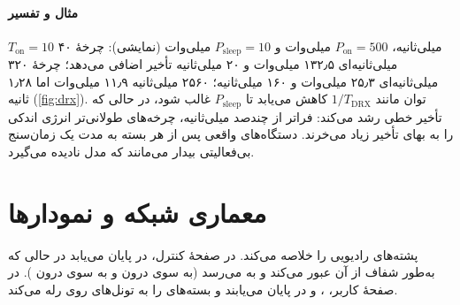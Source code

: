 \documentclass[11pt,a4paper]{article}
\begin{document}
\paragraph{مثال و تفسیر} $T_{\mathrm{on}} = 10$ میلی‌ثانیه، $P_{\mathrm{on}} = 500$ میلی‌وات و
$P_{\mathrm{sleep}} = 10$ میلی‌وات (نمایشی): چرخهٔ ۴۰ میلی‌ثانیه‌ای ۱۳۲٫۵ میلی‌وات و ۲۰ میلی‌ثانیه تأخیر
اضافی می‌دهد؛ چرخهٔ ۳۲۰ میلی‌ثانیه‌ای ۲۵٫۳ میلی‌وات و ۱۶۰ میلی‌ثانیه؛ ۲۵۶۰ میلی‌ثانیه ۱۱٫۹ میلی‌وات اما ۱٫۲۸
ثانیه (\cref{fig:drx}). توان مانند $1/T_{\mathrm{DRX}}$ کاهش می‌یابد تا $P_{\mathrm{sleep}}$ غالب شود، در حالی که
تأخیر خطی رشد می‌کند: فراتر از چندصد میلی‌ثانیه، چرخه‌های طولانی‌تر انرژی اندکی را به بهای تأخیر زیاد
می‌خرند. دستگاه‌های واقعی پس از هر بسته به مدت یک زمان‌سنج بی‌فعالیتی بیدار می‌مانند که مدل نادیده می‌گیرد.

\begin{acnfigure}
  \caption{توان میانگین (محور چپ) و میانگین تأخیر افزوده (محور راست) بر حسب چرخهٔ  برای
  $T_{\mathrm{on}} = 10$\,، بر اساس \cref{eq:drx}.}
  \label{fig:drx}
\end{acnfigure}

\section{معماری شبکه و نمودارها}
 پشته‌های رادیویی را خلاصه می‌کند. در صفحهٔ کنترل،  در  پایان می‌یابد در
حالی که  به‌طور شفاف از آن عبور می‌کند و به  می‌رسد (به سوی  درون  و به
سوی  درون ). در صفحهٔ کاربر، ،  و  در  پایان می‌یابند
و  بسته‌های  را به تونل‌های  روی  رله می‌کند.

\begin{acnfigure}
  \caption{پشته‌های پروتکل رادیویی : صفحهٔ کنترل (چپ) و صفحهٔ کاربر (راست).}
  \label{fig:stacks}
\end{acnfigure}

\end{document}
